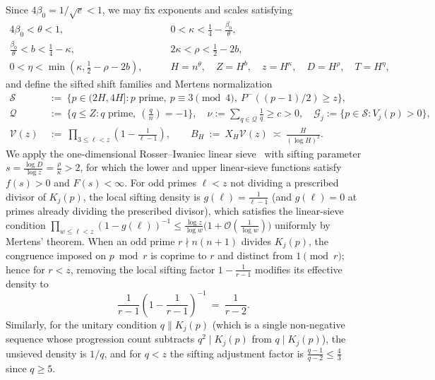 \documentclass[11pt, a4paper]{article}
\theoremstyle{plain}
\theoremstyle{definition}
\newcommand{\leg}[2]{\left(\frac{#1}{#2}\right)}
\begin{document}
Since $4\beta_0=1/\sqrt{e}<1$, we may fix exponents and scales satisfying
\begin{align}
4\beta_0<\theta<1,&\qquad 0<\kappa<\frac14-\frac{\beta_0}{\theta},\nonumber\\
\frac{\beta_0}{\theta}<b<\frac14-\kappa,&\qquad 2\kappa<\rho<\frac12-2b,\label{aud:parameters}\\
0<\eta<\min\!\left(\kappa,\frac12-\rho-2b\right),&\qquad H=n^{\theta},\quad Z=H^{b},\quad z=H^{\kappa},\quad D=H^{\rho},\quad T=H^{\eta},\nonumber
\end{align}
and define the sifted shift families and Mertens normalization
\begin{align}
\mathcal{S}\ &:=\ \big\{p\in(2H,4H]:p\text{ prime},\ p\equiv3\pmod 4,\ P^{-}((p-1)/2)\ge z\big\},\label{aud:S}\\
\mathcal{Q}\ &:=\ \big\{q\le Z:q\text{ prime},\ \leg{q}{n}=-1\big\},\quad \nu:=\sum_{q\in\mathcal{Q}}\frac1q\ge c>0,\quad \mathcal{G}_j:=\big\{p\in\mathcal{S}:V_j(p)>0\big\},\nonumber\\
\mathcal{V}(z)\ &:=\ \prod_{3\le\ell<z}\left(1-\frac{1}{\ell-1}\right),\qquad B_H\ :=\ X_H\mathcal{V}(z)\ \asymp\ \frac{H}{(\log H)^{2}}.\label{aud:B}
\end{align}
We apply the one-dimensional Rosser--Iwaniec linear sieve~\cite[\S5.7.2, (5.116)--(5.117)]{Kumchev} with sifting parameter $s=\frac{\log D}{\log z}=\frac{\rho}{\kappa}>2$, for which the lower and upper linear-sieve functions satisfy $f(s)>0$ and $F(s)<\infty$. For odd primes $\ell<z$ not dividing a prescribed divisor of $K_j(p)$, the local sifting density is $g(\ell)=\frac{1}{\ell-1}$ (and $g(\ell)=0$ at primes already dividing the prescribed divisor), which satisfies the linear-sieve condition $\prod_{w\le\ell<z}(1-g(\ell))^{-1}\le\frac{\log z}{\log w}\big(1+\mathcal{O}(\frac{1}{\log w})\big)$ uniformly by Mertens' theorem. When an odd prime $r\nmid n(n+1)$ divides $K_j(p)$, the congruence imposed on $p\bmod r$ is coprime to $r$ and distinct from $1\pmod r$; hence for $r<z$, removing the local sifting factor $1-\frac{1}{r-1}$ modifies its effective density to
\begin{equation}\label{aud:localh}
\frac{1}{r-1}\left(1-\frac{1}{r-1}\right)^{-1}\ =\ \frac{1}{r-2}.
\end{equation}
Similarly, for the unitary condition $q\parallel K_j(p)$ (which is a single non-negative sequence whose progression count subtracts $q^{2}\mid K_j(p)$ from $q\mid K_j(p)$), the unsieved density is $1/q$, and for $q<z$ the sifting adjustment factor is $\frac{q-1}{q-2}\le\frac43$ since $q\ge5$.
\end{document}
